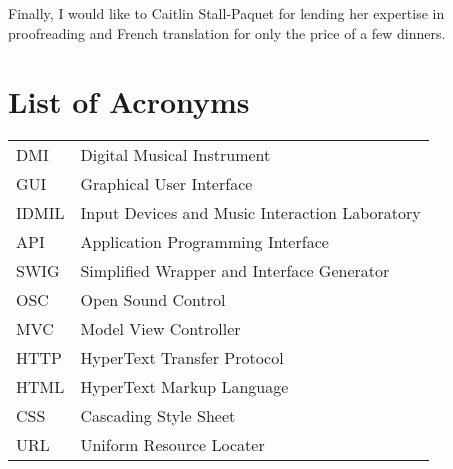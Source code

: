 \documentclass [12pt, letterpaper]{report}
\begin{document}
Finally, I would like to Caitlin Stall-Paquet for lending her expertise in proofreading and French translation for only the price of a few dinners.

\pagebreak


\tableofcontents
\listoffigures

\listoftables

\newpage
\chapter*{List of Acronyms}

\begin{longtable}{ll}
    DMI 	& 	Digital Musical Instrument\\
    GUI		& 	Graphical User Interface\\
    IDMIL &   Input Devices and Music Interaction Laboratory\\ 
    API   &   Application Programming Interface\\
    SWIG  &   Simplified Wrapper and Interface Generator\\
    OSC   &   Open Sound Control\\
    MVC   &   Model View Controller\\
    HTTP  &   HyperText Transfer Protocol\\
    HTML  &   HyperText Markup Language\\
    CSS   &   Cascading Style Sheet\\
    URL   &   Uniform Resource Locater\\
\end{longtable}

\cleardoublepage
{}

%
%
\typeout{}

%
\typeout{}

%
\typeout{}

%
\typeout{}

%
\typeout{}

%
\typeout{}




%
%

\typeout{}
    \renewcommand\refname{References}
    \nocite{*}
    
\end{document}
